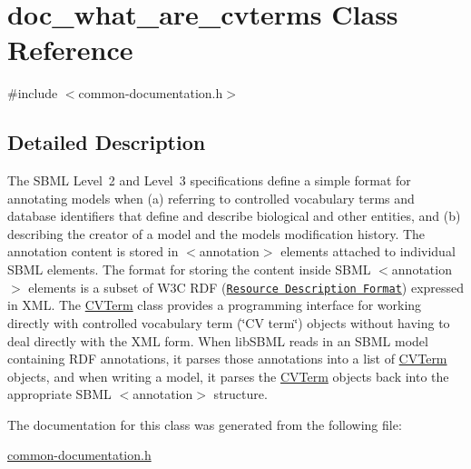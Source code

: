 \hypertarget{classdoc__what__are__cvterms}{}\section{doc\+\_\+what\+\_\+are\+\_\+cvterms Class Reference}
\label{classdoc__what__are__cvterms}


{\ttfamily \#include $<$common-\/documentation.\+h$>$}



\subsection{Detailed Description}
\begin{DoxyParagraph}{}
The S\+B\+ML Level~2 and Level~3 specifications define a simple format for annotating models when (a) referring to controlled vocabulary terms and database identifiers that define and describe biological and other entities, and (b) describing the creator of a model and the model\textquotesingle{}s modification history. The annotation content is stored in {\ttfamily $<$annotation$>$} elements attached to individual S\+B\+ML elements. The format for storing the content inside S\+B\+ML {\ttfamily $<$annotation$>$} elements is a subset of W3C R\+DF (\href{http://www.w3.org/RDF/}{\tt Resource Description Format}) expressed in X\+ML. The \hyperlink{class_c_v_term}{C\+V\+Term} class provides a programming interface for working directly with controlled vocabulary term (\char`\"{}\+C\+V
   term\char`\"{}) objects without having to deal directly with the X\+ML form. When lib\+S\+B\+ML reads in an S\+B\+ML model containing R\+DF annotations, it parses those annotations into a list of \hyperlink{class_c_v_term}{C\+V\+Term} objects, and when writing a model, it parses the \hyperlink{class_c_v_term}{C\+V\+Term} objects back into the appropriate S\+B\+ML {\ttfamily $<$annotation$>$} structure. 
\end{DoxyParagraph}


The documentation for this class was generated from the following file\+:\begin{DoxyCompactItemize}
\item 
\hyperlink{common-documentation_8h}{common-\/documentation.\+h}\end{DoxyCompactItemize}

